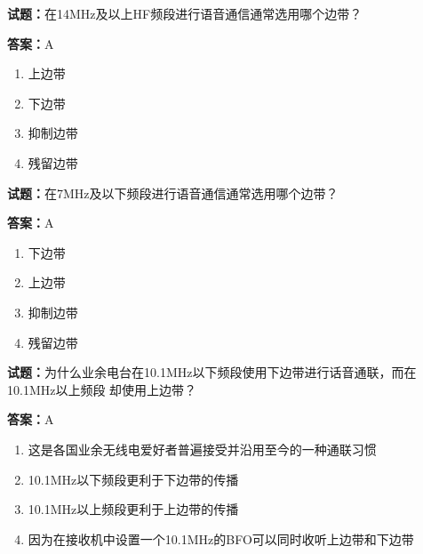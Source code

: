 \documentclass{ctexbook}
\begin{document}




\vspace{1em}

\textbf{试题：}在14MHz及以上HF频段进行语音通信通常选用哪个边带？ 

\textbf{答案：}A 

\begin{enumerate}[leftmargin=3em]
  \item 上边带 

  \item 下边带 

  \item 抑制边带 

  \item 残留边带 

\end{enumerate}





\vspace{1em}

\textbf{试题：}在7MHz及以下频段进行语音通信通常选用哪个边带？ 

\textbf{答案：}A 

\begin{enumerate}[leftmargin=3em]
  \item 下边带 

  \item 上边带 

  \item 抑制边带 

  \item 残留边带 

\end{enumerate}





\vspace{1em}

\textbf{试题：}为什么业余电台在10.1MHz以下频段使用下边带进行话音通联，而在10.1MHz以上频段
却使用上边带？ 

\textbf{答案：}A 

\begin{enumerate}[leftmargin=3em]
  \item 这是各国业余无线电爱好者普遍接受并沿用至今的一种通联习惯 

  \item 10.1MHz以下频段更利于下边带的传播 

  \item 10.1MHz以上频段更利于上边带的传播 

  \item 因为在接收机中设置一个10.1MHz的BFO可以同时收听上边带和下边带 

\end{enumerate}
\end{document}
